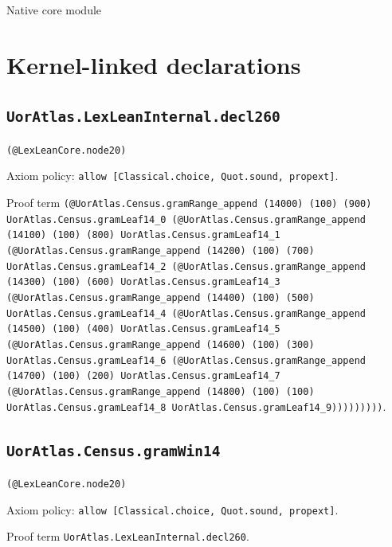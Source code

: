 \documentclass[11pt]{article}
\begin{document}
\begin{center}{\LARGE Native core module}\end{center}
\section*{Kernel-linked declarations}
\subsection*{\texttt{UorAtlas.LexLeanInternal.decl260}}
\noindent\texttt{(@LexLeanCore.node20)}\par
\noindent Axiom policy: \texttt{allow [Classical.choice, Quot.sound, propext]}.\par
\noindent Proof term \texttt{(@UorAtlas.Census.gramRange\_append (14000) (100) (900) UorAtlas.Census.gramLeaf14\_0 (@UorAtlas.Census.gramRange\_append (14100) (100) (800) UorAtlas.Census.gramLeaf14\_1 (@UorAtlas.Census.gramRange\_append (14200) (100) (700) UorAtlas.Census.gramLeaf14\_2 (@UorAtlas.Census.gramRange\_append (14300) (100) (600) UorAtlas.Census.gramLeaf14\_3 (@UorAtlas.Census.gramRange\_append (14400) (100) (500) UorAtlas.Census.gramLeaf14\_4 (@UorAtlas.Census.gramRange\_append (14500) (100) (400) UorAtlas.Census.gramLeaf14\_5 (@UorAtlas.Census.gramRange\_append (14600) (100) (300) UorAtlas.Census.gramLeaf14\_6 (@UorAtlas.Census.gramRange\_append (14700) (100) (200) UorAtlas.Census.gramLeaf14\_7 (@UorAtlas.Census.gramRange\_append (14800) (100) (100) UorAtlas.Census.gramLeaf14\_8 UorAtlas.Census.gramLeaf14\_9)))))))))}.\par
\subsection*{\texttt{UorAtlas.Census.gramWin14}}
\noindent\texttt{(@LexLeanCore.node20)}\par
\noindent Axiom policy: \texttt{allow [Classical.choice, Quot.sound, propext]}.\par
\noindent Proof term \texttt{UorAtlas.LexLeanInternal.decl260}.\par
\end{document}
